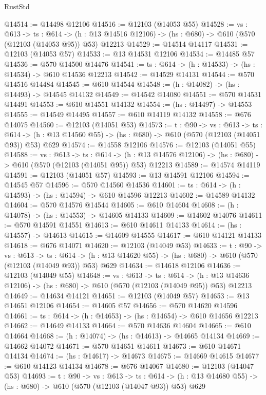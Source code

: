 \begin{lexlean}{RustStd}
\begin{coremodule}
@14514 := @14498 @12106
@14516 := @12103 (@14053 @55)
@14528 := {vs : @613} ->
  {ts : @614} ->
  (h : @13 @14516 @12106) -> (hs : @680) -> @610 (@570 (@12103 (@14053 @95)) @53) @12213
@14529 := @14514 @14117
@14531 := @12103 (@14053 @57)
@14533 := @13 @14531 @12106
@14534 := @14485 @57
@14536 := @570 @14500 @14476
@14541 := {ts : @614} -> (h : @14533) -> (hs : @14534) -> @610 @14536 @12213
@14542 := @14529 @14131
@14544 := @570 @14516 @14484
@14545 := @610 @14544
@14548 := (h : @14082) -> (hs : @14493) -> @14545 @14132
@14549 := @14542 @14080
@14551 := @570 @14531 @14491
@14553 := @610 @14551 @14132
@14554 := (hs : @14497) -> @14553
@14555 := @14549 @14495
@14557 := @610 @14119 @14132
@14558 := @676 @14075
@14560 := @12103 (@14051 @53)
@14573 := {t : @90} ->
  {vs : @613} ->
  {ts : @614} -> (h : @13 @14560 @55) -> (hs : @680) -> @610 (@570 (@12103 (@14051 @93)) @53) @629
@14574 := @14558 @12106
@14576 := @12103 (@14051 @55)
@14588 := {vs : @613} ->
  {ts : @614} ->
  (h : @13 @14576 @12106) -> (hs : @680) -> @610 (@570 (@12103 (@14051 @95)) @53) @12213
@14589 := @14574 @14119
@14591 := @12103 (@14051 @57)
@14593 := @13 @14591 @12106
@14594 := @14545 @57
@14596 := @570 @14560 @14536
@14601 := {ts : @614} -> (h : @14593) -> (hs : @14594) -> @610 @14596 @12213
@14602 := @14589 @14132
@14604 := @570 @14576 @14544
@14605 := @610 @14604
@14608 := (h : @14078) -> (hs : @14553) -> @14605 @14133
@14609 := @14602 @14076
@14611 := @570 @14591 @14551
@14613 := @610 @14611 @14133
@14614 := (hs : @14557) -> @14613
@14615 := @14609 @14555
@14617 := @610 @14121 @14133
@14618 := @676 @14071
@14620 := @12103 (@14049 @53)
@14633 := {t : @90} ->
  {vs : @613} ->
  {ts : @614} -> (h : @13 @14620 @55) -> (hs : @680) -> @610 (@570 (@12103 (@14049 @93)) @53) @629
@14634 := @14618 @12106
@14636 := @12103 (@14049 @55)
@14648 := {vs : @613} ->
  {ts : @614} ->
  (h : @13 @14636 @12106) -> (hs : @680) -> @610 (@570 (@12103 (@14049 @95)) @53) @12213
@14649 := @14634 @14121
@14651 := @12103 (@14049 @57)
@14653 := @13 @14651 @12106
@14654 := @14605 @57
@14656 := @570 @14620 @14596
@14661 := {ts : @614} -> (h : @14653) -> (hs : @14654) -> @610 @14656 @12213
@14662 := @14649 @14133
@14664 := @570 @14636 @14604
@14665 := @610 @14664
@14668 := (h : @14074) -> (hs : @14613) -> @14665 @14134
@14669 := @14662 @14072
@14671 := @570 @14651 @14611
@14673 := @610 @14671 @14134
@14674 := (hs : @14617) -> @14673
@14675 := @14669 @14615
@14677 := @610 @14123 @14134
@14678 := @676 @14067
@14680 := @12103 (@14047 @53)
@14693 := {t : @90} ->
  {vs : @613} ->
  {ts : @614} -> (h : @13 @14680 @55) -> (hs : @680) -> @610 (@570 (@12103 (@14047 @93)) @53) @629

\end{coremodule}
\end{lexlean}
